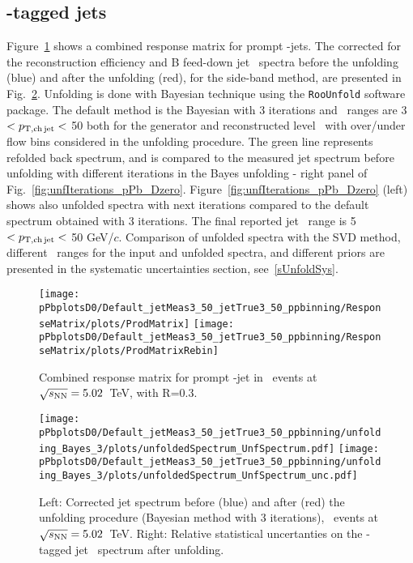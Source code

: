 \subsection{\Dzero-tagged jets}
Figure~\ref{fig:pPb_ResponseMatrix_Dzero} shows a combined response matrix for prompt \Dzero-jets.
The corrected for the reconstruction efficiency and B feed-down jet \pt\ spectra before the unfolding (blue) and after the unfolding (red), for the side-band method, are presented in Fig.~\ref{fig:UnfSpec_pPb_Dzero}.
Unfolding is done with Bayesian technique using the \texttt{RooUnfold} software package. The default method is the Bayesian with 3 iterations and \ptchjet\ ranges are 3 $< p_{\mathrm{T,ch\, jet}}< $ 50 both for the generator and reconstructed level \pt\, with over/under flow bins considered in the unfolding procedure.
The green line represents refolded back spectrum, and is compared to the measured jet spectrum before unfolding with different iterations in the Bayes unfolding - right panel of Fig.~\ref{fig:unfIterations_pPb_Dzero}. Figure~\ref{fig:unfIterations_pPb_Dzero} (left) shows also unfolded spectra with next iterations compared to the default spectrum obtained with 3 iterations.
The final reported jet \pt\ range is 5 $< p_{\mathrm{T,ch\, jet}}<$ 50 GeV/$c$.
Comparison of unfolded spectra with the SVD method, different \pt\ ranges for the input and unfolded spectra, and different priors are presented in the systematic uncertainties section, see~\ref{sUnfoldSys}. 

\begin{figure}[bth]
\centering
\texttt{[image: pPbplotsD0/Default\_jetMeas3\_50\_jetTrue3\_50\_ppbinning/ResponseMatrix/plots/ProdMatrix]}
\texttt{[image: pPbplotsD0/Default\_jetMeas3\_50\_jetTrue3\_50\_ppbinning/ResponseMatrix/plots/ProdMatrixRebin]}
\caption{Combined response matrix for prompt \Dzero-jet in \pPb\ events at $\sqrt{s_{\rm NN}}=5.02$~TeV, with R=0.3.}
\label{fig:pPb_ResponseMatrix_Dzero}
\end{figure}

\begin{figure}[bth]
\centering
\texttt{[image: pPbplotsD0/Default\_jetMeas3\_50\_jetTrue3\_50\_ppbinning/unfolding\_Bayes\_3/plots/unfoldedSpectrum\_UnfSpectrum.pdf]}
\texttt{[image: pPbplotsD0/Default\_jetMeas3\_50\_jetTrue3\_50\_ppbinning/unfolding\_Bayes\_3/plots/unfoldedSpectrum\_UnfSpectrum\_unc.pdf]}
\caption{Left: Corrected jet \pt spectrum before (blue) and after (red) the unfolding procedure (Bayesian method with 3 iterations), \pPb\ events at $\sqrt{s_{\rm NN}}=5.02$~TeV. Right: Relative statistical uncertanties on the \Dzero-tagged jet \pt\ spectrum after unfolding.}
\label{fig:UnfSpec_pPb_Dzero}
\end{figure}

